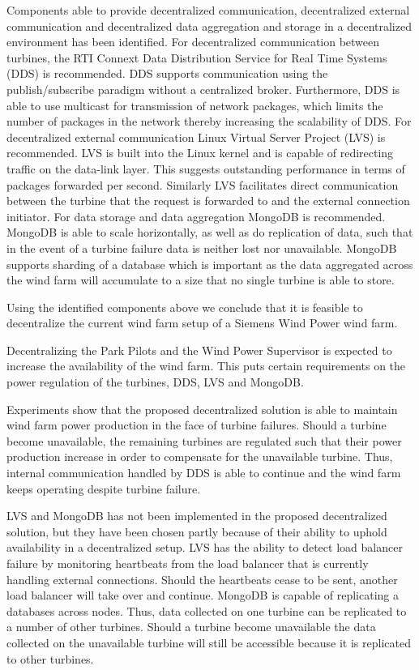 Components able to provide decentralized communication, decentralized external communication and decentralized data aggregation and storage in a decentralized environment has been identified.
For decentralized communication between turbines, the RTI Connext Data Distribution Service for Real Time Systems (DDS) is recommended. DDS supports communication using the publish/subscribe paradigm without a centralized broker. Furthermore, DDS is able to use multicast for transmission of network packages, which limits the number of packages in the network thereby increasing the scalability of DDS.
For decentralized external communication Linux Virtual Server Project (LVS) is recommended. LVS is built into the Linux kernel and is capable of redirecting traffic on the data-link layer. This suggests outstanding performance in terms of packages forwarded per second. Similarly LVS facilitates direct communication between the turbine that the request is forwarded to and the external connection initiator.
For data storage and data aggregation MongoDB is recommended. MongoDB is able to scale horizontally, as well as do replication of data, such that in the event of a turbine failure data is neither lost nor unavailable. MongoDB supports sharding of a database which is important as the data aggregated across the wind farm will accumulate to a size that no single turbine is able to store.

Using the identified components above we conclude that it is feasible to decentralize the current wind farm setup of a Siemens Wind Power wind farm.

Decentralizing the Park Pilots and the Wind Power Supervisor is expected to increase the availability of the wind farm. This puts certain requirements on the power regulation of the turbines, DDS, LVS and MongoDB.

Experiments show that the proposed decentralized solution is able to maintain wind farm power production in the face of turbine failures. Should a turbine become unavailable, the remaining turbines are regulated such that their power production increase in order to compensate for the unavailable turbine. Thus, internal communication handled by DDS is able to continue and the wind farm keeps operating despite turbine failure.

LVS and MongoDB has not been implemented in the proposed decentralized solution, but they have been chosen partly because of their ability to uphold availability in a decentralized setup. LVS has the ability to detect load balancer failure by monitoring heartbeats from the load balancer that is currently handling external connections. Should the heartbeats cease to be sent, another load balancer will take over and continue. MongoDB is capable of replicating a databases across nodes. Thus, data collected on one turbine can be replicated to a number of other turbines. Should a turbine become unavailable the data collected on the unavailable turbine will still be accessible because it is replicated to other turbines.

